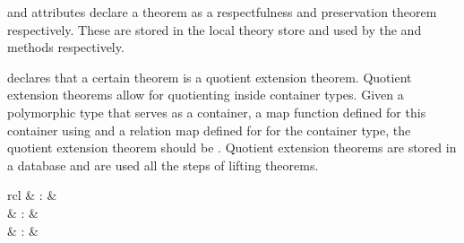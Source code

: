 \begin{isabellebody}
\begin{isamarkuptext}
\begin{description}
  \item \hyperlink{attribute.HOL.quot-respect}{\mbox{}} and \hyperlink{attribute.HOL.quot-preserve}{\mbox{}} attributes declare a theorem as a respectfulness
    and preservation theorem respectively.  These are stored in the
    local theory store and used by the \hyperlink{method.HOL.injection}{\mbox{}}
    and \hyperlink{method.HOL.cleaning}{\mbox{}} methods respectively.

  \item \hyperlink{attribute.HOL.quot-thm}{\mbox{}} declares that a certain theorem
    is a quotient extension theorem. Quotient extension theorems
    allow for quotienting inside container types. Given a polymorphic
    type that serves as a container, a map function defined for this
    container  using \hyperlink{command.HOL.enriched-type}{\mbox{}} and a relation
    map defined for for the container type, the quotient extension
    theorem should be . Quotient extension theorems
    are stored in a database and are used all the steps of lifting
    theorems.

  \end{description}%
\end{isamarkuptext}%
\isamarkuptrue%
%
\isamarkuptrue%
%
\begin{isamarkuptext}%
\begin{matharray}{rcl}
    \hypertarget{attribute.HOL.coercion}{\hyperlink{attribute.HOL.coercion}{\mbox{}}} & : &  \\
    \hypertarget{attribute.HOL.coercion-enabled}{\hyperlink{attribute.HOL.coercion-enabled}{\mbox{}}} & : &  \\
    \hypertarget{attribute.HOL.coercion-map}{\hyperlink{attribute.HOL.coercion-map}{\mbox{}}} & : &  \\
  \end{matharray}


\end{isamarkuptext}
\end{isabellebody}

